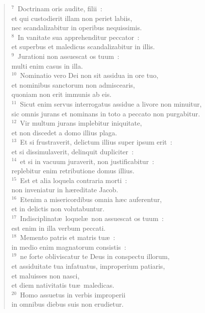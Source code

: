 \begin{verse}${}^{7}$~Doctrinam oris audite, filii~:\\ et qui custodierit illam non periet labiis,\\ nec scandalizabitur in operibus nequissimis.\\
${}^{8}$~In vanitate sua apprehenditur peccator~:\\ et superbus et maledicus scandalizabitur in illis.\\
${}^{9}$~Jurationi non assuescat os tuum~:\\ multi enim casus in illa.\\
${}^{10}$~Nominatio vero Dei non sit assidua in ore tuo,\\ et nominibus sanctorum non admiscearis,\\ quoniam non erit immunis ab eis.\\
${}^{11}$~Sicut enim servus interrogatus assidue a livore non minuitur,\\ sic omnis jurans et nominans in toto a peccato non purgabitur.\\
${}^{12}$~Vir multum jurans implebitur iniquitate,\\ et non discedet a domo illius plaga.\\
${}^{13}$~Et si frustraverit, delictum illius super ipsum erit~:\\ et si dissimulaverit, delinquit dupliciter~:\\
${}^{14}$~et si in vacuum juraverit, non justificabitur~:\\ replebitur enim retributione domus illius.\\
${}^{15}$~Est et alia loquela contraria morti~:\\ non inveniatur in h\ae reditate Jacob.\\
${}^{16}$~Etenim a misericordibus omnia h\ae c auferentur,\\ et in delictis non volutabuntur.\\
${}^{17}$~Indisciplinat\ae\ loquel\ae\ non assuescat os tuum~:\\ est enim in illa verbum peccati.\\
${}^{18}$~Memento patris et matris tu\ae~:\\ in medio enim magnatorum consistis~:\\
${}^{19}$~ne forte obliviscatur te Deus in conspectu illorum,\\ et assiduitate tua infatuatus, improperium patiaris,\\ et maluisses non nasci,\\ et diem nativitatis tu\ae\ maledicas.\\
${}^{20}$~Homo assuetus in verbis improperii\\ in omnibus diebus suis non erudietur.\end{verse}


